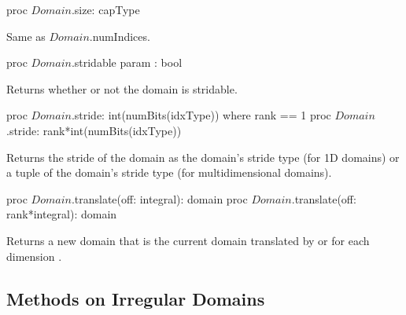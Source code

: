 \begin{protohead}
proc $Domain$.size: capType
\end{protohead}
\begin{protobody}
Same as $Domain$.numIndices.
\end{protobody}

\begin{protohead}
proc $Domain$.stridable param : bool
\end{protohead}
\begin{protobody}
Returns whether or not the domain is stridable.
\end{protobody}

\begin{protohead}
proc $Domain$.stride: int(numBits(idxType)) where rank == 1
proc $Domain$.stride: rank*int(numBits(idxType))
\end{protohead}
\begin{protobody}
Returns the stride of the domain as the domain's stride type (for 1D
domains) or a tuple of the domain's stride type (for multidimensional
domains).
\end{protobody}

\begin{protohead}
proc $Domain$.translate(off: integral): domain
proc $Domain$.translate(off: rank*integral): domain
\end{protohead}
\begin{protobody}
Returns a new domain that is the current domain translated
by  or  for each dimension .
\end{protobody}


\subsection{Methods on Irregular Domains}

